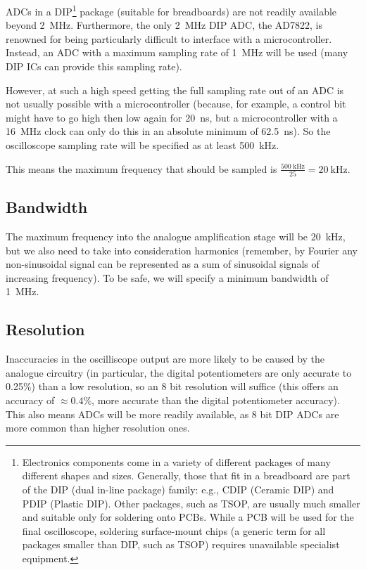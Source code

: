 ADCs in a DIP\footnote{Electronics components come in a variety of different
packages of many different shapes and sizes. Generally, those that fit in a
breadboard are part of the DIP (dual in-line package) family: e.g., CDIP
(Ceramic DIP) and PDIP (Plastic DIP). Other packages, such as TSOP, are usually
much smaller and suitable only for soldering onto PCBs. While a PCB will be used
for the final oscilloscope, soldering surface-mount chips (a generic term for
all packages smaller than DIP, such as TSOP) requires unavailable specialist
equipment.} package (suitable for breadboards) are not readily available beyond
\SI{2}{\MHz}. Furthermore, the only \SI{2}{\MHz} DIP ADC, the AD7822, is
renowned for being particularly difficult to interface with a microcontroller.
Instead, an ADC with a maximum sampling rate of \SI{1}{\MHz} will be used (many
DIP ICs can provide this sampling rate).

However, at such a high speed getting the full sampling rate out of an ADC is
not usually possible with a microcontroller (because, for example, a control bit
might have to go high then low again for \SI{20}{\ns}, but a microcontroller
with a \SI{16}{\MHz} clock can only do this in an absolute minimum of
\SI{62.5}{\ns}). So the oscilloscope sampling rate will be specified as at least
\SI{500}{\kHz}.

This means the maximum frequency that should be sampled is
$\frac{\SI{500}{\kHz}}{25} = \SI{20}{\kHz}$.

\subsection*{Bandwidth}

The maximum frequency into the analogue amplification stage will be
\SI{20}{\kHz}, but we also need to take into consideration harmonics (remember,
by Fourier any non-sinusoidal signal can be represented as a sum of sinusoidal
signals of increasing frequency). To be safe, we will specify a minimum
bandwidth of \SI{1}{\MHz}.

\subsection*{Resolution}

Inaccuracies in the oscilliscope output are more likely to be caused by the
analogue circuitry (in particular, the digital potentiometers are only accurate
to 0.25\%) than a low resolution, so an 8 bit resolution will suffice (this
offers an accuracy of $\approx 0.4\%$, more accurate than the digital
potentiometer accuracy). This also means ADCs will be more readily available, as
8 bit DIP ADCs are more common than higher resolution ones.

